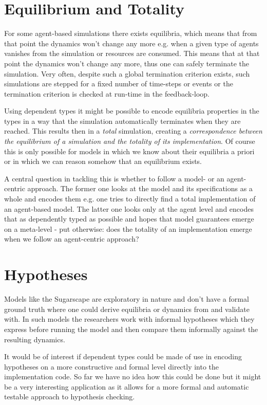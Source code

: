 \section{Equilibrium and Totality}
For some agent-based simulations there exists equilibria, which means that from that point the dynamics won't change any more e.g. when a given type of agents vanishes from the simulation or resources are consumed. This means that at that point the dynamics won't change any more, thus one can safely terminate the simulation. Very often, despite such a global termination criterion exists, such simulations are stepped for a fixed number of time-steps or events or the termination criterion is checked at run-time in the feedback-loop. 
	
Using dependent types it might be possible to encode equilibria properties in the types in a way that the simulation automatically terminates when they are reached. This results then in a \textit{total} simulation, creating a \textit{correspondence between the equilibrium of a simulation and the totality of its implementation}. Of course this is only possible for models in which we know about their equilibria a priori or in which we can reason somehow that an equilibrium exists.

A central question in tackling this is whether to follow a model- or an agent-centric approach. The former one looks at the model and its specifications as a whole and encodes them e.g. one tries to directly find a total implementation of an agent-based model. The latter one looks only at the agent level and encodes that as dependently typed as possible and hopes that model guarantees emerge on a meta-level - put otherwise: does the totality of an implementation emerge when we follow an agent-centric approach?

\section{Hypotheses}
Models like the Sugarscape are exploratory in nature and don't have a formal ground truth where one could derive equilibria or dynamics from and validate with. In such models the researchers work with informal hypotheses which they express before running the model and then compare them informally against the resulting dynamics.

It would be of interest if dependent types could be made of use in encoding hypotheses on a more constructive and formal level directly into the implementation code. So far we have no idea how this could be done but it might be a very interesting application as it allows for a more formal and automatic testable approach to hypothesis checking.

